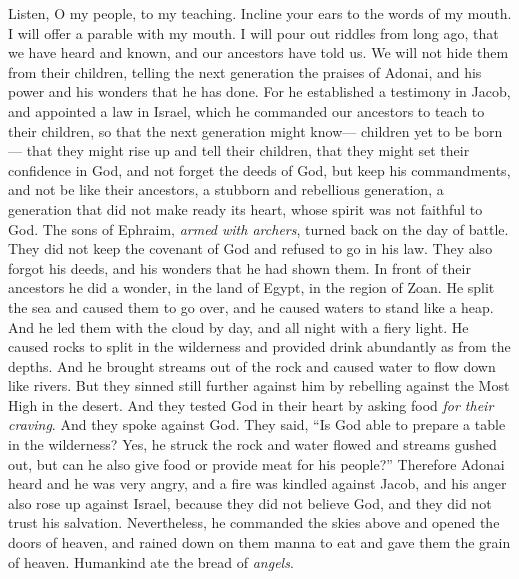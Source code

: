 \begin{biblechapter} %
 Listen, O my people, to my teaching. 
Incline your ears to the words of my mouth.
\verse I will offer a parable with my mouth. 
I will pour out riddles from long ago,
\verse that we have heard and known, 
and our ancestors have told us.
\verse We will not hide them from their children, 
telling the next generation the praises of Adonai, 
and his power and his wonders that he has done.
\verse For he established a testimony in Jacob, 
and appointed a law in Israel, 
which he commanded our ancestors 
to teach to their children,
\verse so that the next generation might know— 
children yet to be born— 
that they might rise up and tell their children,
\verse that they might set their confidence in God, 
and not forget the deeds of God, 
but keep his commandments,
\verse and not be like their ancestors, 
a stubborn and rebellious generation, 
a generation that did not make ready its heart, 
whose spirit was not faithful to God.
\verse The sons of Ephraim, \textit{armed with archers}, 
turned back on the day of battle.
\verse They did not keep the covenant of God 
and refused to go in his law.
\verse They also forgot his deeds, 
and his wonders that he had shown them.
\verse In front of their ancestors he did a wonder, 
in the land of Egypt, in the region of Zoan.
\verse He split the sea and caused them to go over, 
and he caused waters to stand like a heap.
\verse And he led them with the cloud by day, 
and all night with a fiery light.
\verse He caused rocks to split in the wilderness 
and provided drink abundantly as from the depths.
\verse And he brought streams out of the rock 
and caused water to flow down like rivers.
\verse But they sinned still further against him 
by rebelling against the Most High in the desert.
\verse And they tested God in their heart 
by asking food \textit{for their craving}.
\verse And they spoke against God. 
They said, “Is God able 
to prepare a table in the wilderness?
\verse Yes, he struck the rock and water flowed 
and streams gushed out, 
but can he also give food 
or provide meat for his people?”
\verse Therefore Adonai heard 
and he was very angry, 
and a fire was kindled against Jacob, 
and his anger also rose up against Israel,
\verse because they did not believe God, 
and they did not trust his salvation.
\verse Nevertheless, he commanded the skies above 
and opened the doors of heaven,
\verse and rained down on them manna to eat 
and gave them the grain of heaven.
\verse Humankind ate the bread of \textit{angels}. 

\end{biblechapter}
